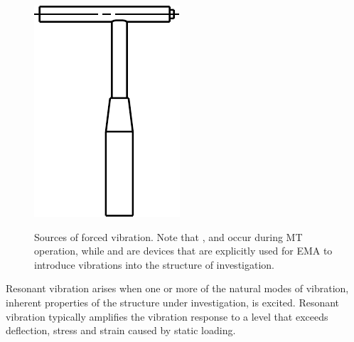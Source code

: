 \begin{figure}[!htb]
{    \includegraphics[scale=0.7]{figures/ema/vibration_sources/impulse_hammer_scheme}}
  \endgroup
  \hspace{0em}
  \caption[Forced Vibration Sources]{Sources of forced vibration. Note that ,  and  occur during \ac{MT} operation, while  and  are devices that are explicitly used for \ac{EMA} to introduce vibrations into the structure of investigation.%
    \label{fig:vibration_sources}}
\end{figure}

Resonant vibration arises when one or more of the natural modes of vibration, inherent properties of the structure under investigation, is excited. Resonant vibration typically amplifies the vibration response to a level that exceeds deflection, stress and strain caused by static loading.

